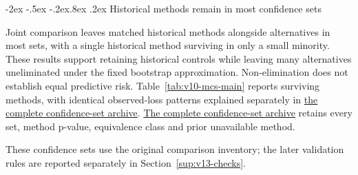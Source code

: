\documentclass[12pt,a4paper]{article}
\makeatletter
\renewcommand\section{\@startsection{section}{1}{\z@}%
  {-2ex \@plus -.5ex \@minus -.2ex}{.8ex \@plus .2ex}%
  {\normalfont\large\bfseries}}
\makeatother
\begin{document}
\section{Historical methods remain in most confidence sets}\label{sup:v10-mcs}\label{sup:v13-mcs}

Joint comparison leaves matched historical methods alongside alternatives in most sets, with a single historical method surviving in only a small minority. These results support retaining historical controls while leaving many alternatives uneliminated under the fixed bootstrap approximation. Non-elimination does not establish equal predictive risk. Table~\ref{tab:v10-mcs-main} reports surviving methods, with identical observed-loss patterns explained separately in \href{https://github.com/ByronLi0207/financial-mathematics-paper-20261020/blob/submission-final/EXTENDED_RESULTS.md#asmbi-extended-s31}{the complete confidence-set archive}. \href{https://github.com/ByronLi0207/financial-mathematics-paper-20261020/blob/submission-final/EXTENDED_RESULTS.md#asmbi-extended-s31}{The complete confidence-set archive} retains every set, method p-value, equivalence class and prior unavailable method.

These confidence sets use the original comparison inventory; the later validation rules are reported separately in Section~\ref{sup:v13-checks}.
\end{document}
